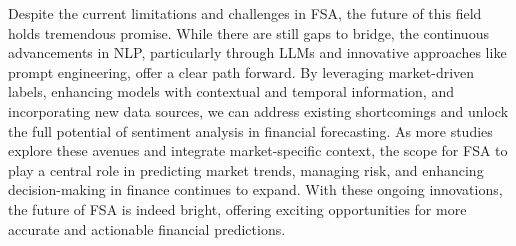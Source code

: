 Despite the current limitations and challenges in FSA, the future of this field holds tremendous promise. While there are still gaps to bridge, the continuous advancements in NLP, particularly through LLMs and innovative approaches like prompt engineering, offer a clear path forward. By leveraging market-driven labels, enhancing models with contextual and temporal information, and incorporating new data sources, we can address existing shortcomings and unlock the full potential of sentiment analysis in financial forecasting. As more studies explore these avenues and integrate market-specific context, the scope for FSA to play a central role in predicting market trends, managing risk, and enhancing decision-making in finance continues to expand. With these ongoing innovations, the future of FSA is indeed bright, offering exciting opportunities for more accurate and actionable financial predictions.